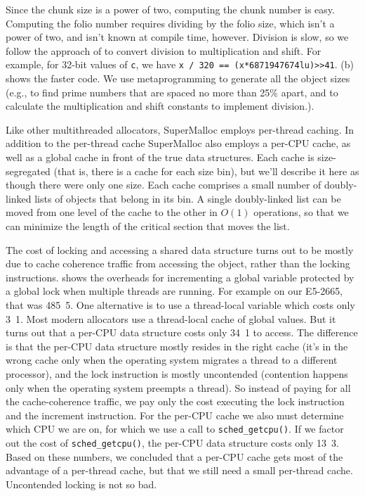 \documentclass[pldi]{sigplanconf-pldi15}
\newcommand{\code}[1]{\texttt{#1}}
\begin{document}
Since the chunk size is a power of two, computing the chunk number is
easy.  Computing the folio number requires dividing by the folio size,
which isn't a power of two, and isn't known at compile time, however.
Division is slow, so we follow the approach of
\cite{MagenheimerPePe87} to convert division to multiplication and
shift.  For example, for 32-bit values of \code{c}, we have
\texttt{x / 320 == (x*6871947674lu)>>41}.  (b)
shows the faster code.  We use metaprogramming to generate all the
object sizes (e.g., to find prime numbers that are spaced no more than
25\% apart, and to calculate the multiplication and shift constants to
implement division.).


Like other multithreaded allocators, SuperMalloc employs per-thread
caching.  In addition to the per-thread cache SuperMalloc also employs
a per-CPU cache, as well as a global cache in front of the true data
structures.  Each cache is size-segregated (that is, there is a cache
for each size bin), but we'll describe it here as though there were
only one size.  Each cache comprises a small number of doubly-linked
lists of objects that belong in its bin.  A single doubly-linked list
can be moved from one level of the cache to the other in $O(1)$
operations, so that we can minimize the length of the critical section
that moves the list.

The cost of locking and accessing a shared data structure turns out to
be mostly due to cache coherence traffic from accessing the object,
rather than the locking instructions.   shows the
overheads for incrementing a global variable protected by a global
lock when multiple threads are running.  For example on our E5-2665,
that was \unit{485.5}\nano\second.  One alternative is to use a
thread-local variable which costs only \unit{3.1}\nano\second.  Most modern
allocators use a thread-local cache of global values.  But it turns
out that a per-CPU data structure costs only \unit{34.1}\nano\second{}
to access.  The difference is that the per-CPU data structure mostly
resides in the right cache (it's in the wrong cache only when the
operating system migrates a thread to a different processor), and the
lock instruction is mostly uncontended (contention happens only when
the operating system preempts a thread).  So instead of paying for all
the cache-coherence traffic, we pay only the cost executing the lock
instruction and the increment instruction.  For the per-CPU cache we
also must determine which CPU we are on, for which we use a call to
\code{sched_getcpu()}.  If we factor out the cost of
\code{sched_getcpu()}, the per-CPU data structure costs only
\unit{13.3}\nano\second.  Based on these numbers, we concluded that a
per-CPU cache gets most of the advantage of a per-thread cache, but
that we still need a small per-thread cache.  Uncontended locking is
not so bad.
\end{document}
